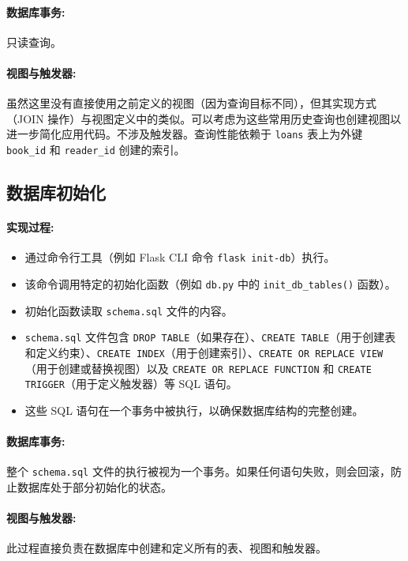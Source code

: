 \documentclass[11pt, a4paper]{article}
\begin{document}
\paragraph{数据库事务:}
只读查询。
\paragraph{视图与触发器:}
虽然这里没有直接使用之前定义的视图（因为查询目标不同），但其实现方式（JOIN 操作）与视图定义中的类似。可以考虑为这些常用历史查询也创建视图以进一步简化应用代码。不涉及触发器。查询性能依赖于 \texttt{loans} 表上为外键 \texttt{book\_id} 和 \texttt{reader\_id} 创建的索引。

\subsection{数据库初始化}
\paragraph{实现过程:}
\begin{itemize}
    \item 通过命令行工具（例如 Flask CLI 命令 \texttt{flask init-db}）执行。
    \item 该命令调用特定的初始化函数（例如 \texttt{db.py} 中的 \texttt{init\_db\_tables()} 函数）。
    \item 初始化函数读取 \texttt{schema.sql} 文件的内容。
    \item \texttt{schema.sql} 文件包含 \texttt{DROP TABLE}（如果存在）、\texttt{CREATE TABLE}（用于创建表和定义约束）、\texttt{CREATE INDEX}（用于创建索引）、\texttt{CREATE OR REPLACE VIEW}（用于创建或替换视图）以及 \texttt{CREATE OR REPLACE FUNCTION} 和 \texttt{CREATE TRIGGER}（用于定义触发器）等 SQL 语句。
    \item 这些 SQL 语句在一个事务中被执行，以确保数据库结构的完整创建。
\end{itemize}
\paragraph{数据库事务:}
整个 \texttt{schema.sql} 文件的执行被视为一个事务。如果任何语句失败，则会回滚，防止数据库处于部分初始化的状态。
\paragraph{视图与触发器:}
此过程直接负责在数据库中创建和定义所有的表、视图和触发器。
\end{document}
